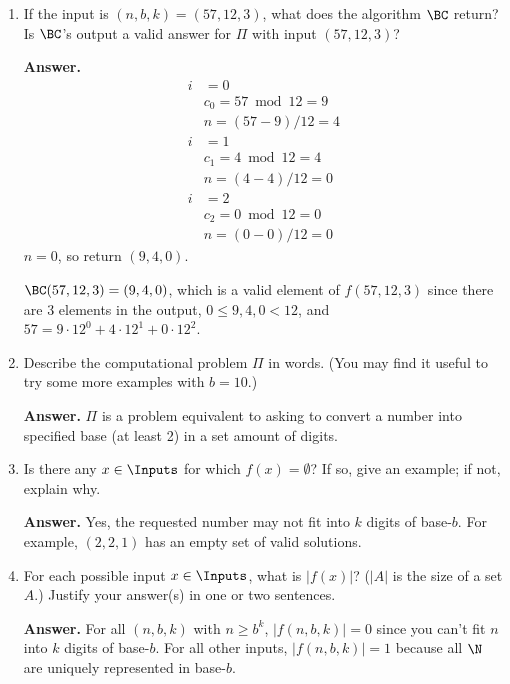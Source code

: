 \documentclass[11pt]{article}
\begin{document}
\begin{enumerate}
\begin{enumerate}
\item If the input is $(n,b,k) = (57,12,3)$, what does the algorithm $\BC$ return? Is $\BC$'s output a valid answer for $\Pi$ with input $(57,12,3)$?

\vspace{0.5em}
\noindent\textbf{Answer.}
\begin{align*}
i&=0\\
&c_0 = 57 \bmod 12 = 9\\
&n = (57-9)/12 = 4\\
i&=1\\
&c_1 = 4 \bmod 12 = 4\\
&n = (4-4)/12 = 0\\
i&=2\\
&c_2 = 0 \bmod 12 = 0\\
&n = (0-0)/12 = 0
\end{align*}
$n=0$, so return $(9,4,0)$.

\noindent $\BC(57,12,3) = (9,4,0)$, which is a valid element of $f(57,12,3)$ since there are 3 elements in the output, $0\leq 9,4,0 < 12$, and $57 = 9\cdot 12^{0} + 4\cdot 12^{1} + 0\cdot 12^{2}$.

\item Describe the computational problem $\Pi$ in words.  (You may find it useful to try some more examples with $b=10$.)

\vspace{0.5em}
\noindent\textbf{Answer.} $\Pi$ is a problem equivalent to asking to convert a number into specified base (at least 2) in a set amount of digits.

\item Is there any $x\in \Inputs$ for which $f(x)=\emptyset$? If so, give an example; if not, explain why.

\vspace{0.5em}
\noindent\textbf{Answer.} Yes, the requested number may not fit into $k$ digits of base-$b$. For example, $(2,2,1)$ has an empty set of valid solutions.

\item For each possible input $x\in \Inputs$, what is $|f(x)|$? ($|A|$ is the size of a set $A$.) Justify your answer(s) in one or two sentences.

\vspace{0.5em}
\noindent\textbf{Answer.} For all $(n,b,k)$ with $n\geq b^{k}$, $|f(n,b,k)| = 0$ since you can't fit $n$ into $k$ digits of base-$b$. For all other inputs, $|f(n,b,k)| = 1$ because all $\N$ are uniquely represented in base-$b$.


\end{enumerate}
\end{enumerate}
\end{document}
